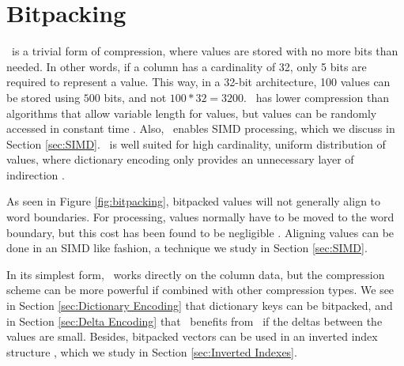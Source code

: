 \section{Bitpacking}
\label{sec:Bitpacking}


\bp~is a trivial form of compression, where values are stored with no more bits than needed. In other words, if a column has a cardinality of 32, only 5 bits are required to represent a value. This way, in a 32-bit architecture, 100 values can be stored using $500$ bits, and not $100*32 = 3200$. \bp~has lower compression than algorithms that allow variable length for values, but values can be randomly accessed in constant time \cite{Raman2008-gi, Willhalm2013-ri}. Also, \bp~enables SIMD processing, which we discuss in Section \ref{sec:SIMD}. \bp~is well suited for high cardinality, uniform distribution of values, where dictionary encoding only provides an unnecessary layer of indirection \cite{Holloway2008-rr}.

As seen in Figure \ref{fig:bitpacking}, bitpacked values will not generally align to word boundaries. For processing, values normally have to be moved to the word boundary, but this cost has been found to be negligible \cite{Holloway2008-rr}. Aligning values can be done in an SIMD like fashion, a technique we study in Section \ref{sec:SIMD}.

In its simplest form, \bp~works directly on the column data, but the compression scheme can be more powerful if combined with other compression types. We see in Section \ref{sec:Dictionary Encoding} that dictionary keys can be bitpacked, and in Section \ref{sec:Delta Encoding} that \dele~benefits from \bp~if the deltas between the values are small. Besides, bitpacked vectors can be used in an inverted index structure \cite{Schwalb2014-hn}, which we study in Section \ref{sec:Inverted Indexes}.

